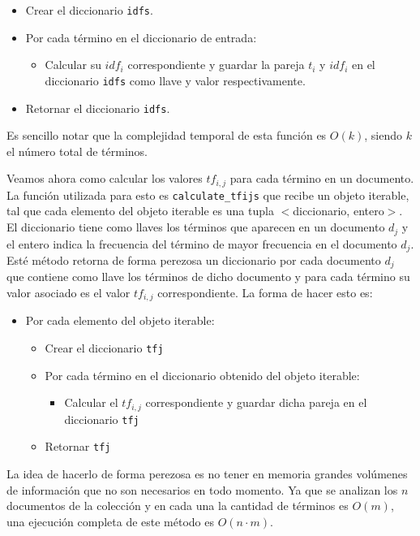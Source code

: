 \documentclass[runningheads]{llncs}
\begin{document}
	\begin{itemize}
		\item Crear el diccionario \verb|idfs|.
		\item Por cada t\'ermino en el diccionario de entrada:
		\begin{itemize}
			\item Calcular su $idf_i$ correspondiente y guardar la pareja $t_i$ y $idf_i$ en el diccionario \verb|idfs| como llave y valor respectivamente.
		\end{itemize}
		\item  Retornar el diccionario \verb|idfs|.
	\end{itemize}
	 
	 Es sencillo notar que la complejidad temporal de esta funci\'on es $O(k)$, siendo $k$ el n\'umero total de t\'erminos.
	
	Veamos ahora como calcular los valores $tf_{i,j}$ para cada t\'ermino en un documento. La funci\'on utilizada para esto es \verb|calculate_tfijs| que recibe un objeto iterable, tal que cada elemento del objeto iterable es una tupla $<$diccionario, entero$>$. El diccionario tiene como llaves los t\'erminos que aparecen en un documento $d_j$ y el entero indica la frecuencia del t\'ermino de mayor frecuencia en el documento $d_j$. Est\'e m\'etodo retorna de forma perezosa un diccionario por cada documento $d_j$ que contiene como llave los t\'erminos de dicho documento y para cada t\'ermino su valor asociado es el valor $tf_{i,j}$ correspondiente. La forma de hacer esto es:
	
	\begin{itemize}
		\item Por cada elemento del objeto iterable:
		\begin{itemize}
			\item Crear el diccionario \verb|tfj|
			\item Por cada t\'ermino en el diccionario obtenido del objeto iterable:
			\begin{itemize}
				\item Calcular el $tf_{i,j}$ correspondiente y guardar dicha pareja en el diccionario \verb|tfj|
			\end{itemize}
			\item Retornar \verb|tfj| 
		\end{itemize}
	\end{itemize}
	
	La idea de hacerlo de forma perezosa es no tener en memoria grandes vol\'umenes de informaci\'on que no son necesarios en todo momento. Ya que se analizan los $n$ documentos de la colecci\'on y en cada una la cantidad de t\'erminos es $O(m)$, una ejecuci\'on completa de este m\'etodo es $O(n\cdot m)$.
	
\end{document}
